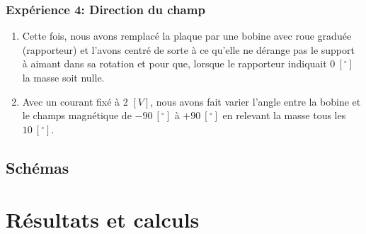 \documentclass[11pt]{article}
\begin{document}
    \subsubsection{Expérience 4: Direction du champ}
    \begin{enumerate}
        \item Cette fois, nous avons remplacé la plaque par une bobine avec roue graduée (rapporteur) et
        l'avons centré de sorte à ce qu'elle ne dérange pas le support à aimant dans sa rotation et pour que,
        lorsque le rapporteur indiquait $0 \ [^\circ]$ la masse soit nulle.
        \item Avec un courant fixé à 2 $[V]$, nous avons fait varier l'angle entre la bobine et le champs
        magnétique de $-90 \ [^\circ]$ à $+90 \ [^\circ]$ en relevant la masse tous les $10 \ [^\circ]$.
    \end{enumerate}

    \subsection{Schémas}\label{subsec:schemas}

    \begin{minipage}{.45\textwidth}
        
    \end{minipage}
    \hfill
    \begin{minipage}{.45\textwidth}
        
    \end{minipage}


    \section{Résultats et calculs}\label{sec:resultats-et-calculs}
\end{document}
